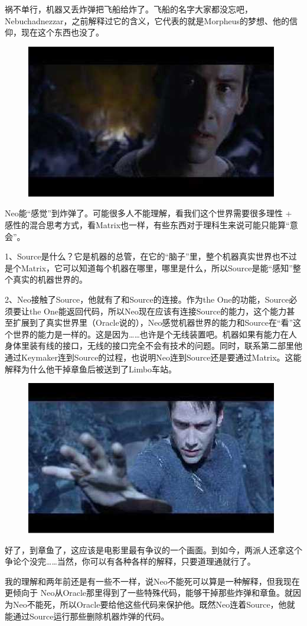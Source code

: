 \documentclass[UTF8]{ctexart}
\begin{document}
祸不单行，机器又丢炸弹把飞船给炸了。飞船的名字大家都没忘吧，Nebuchadnezzar，之前解释过它的含义，它代表的就是Morpheus的梦想、他的信仰，现在这个东西也没了。

\begin{figure}[htb]
\centering
\includegraphics[width=0.5\linewidth]{fig/read_reloaded-176}
\end{figure}

Neo能“感觉”到炸弹了。可能很多人不能理解，看我们这个世界需要很多理性 + 感性的混合思考方式，看Matrix也一样，有些东西对于理科生来说可能只能算“意会”。

1、Source是什么？它是机器的总管，在它的“脑子”里，整个机器真实世界也不过是个Matrix，它可以知道每个机器在哪里，哪里是什么，所以Source是能“感知”整个真实的机器世界的。

2、Neo接触了Source，他就有了和Source的连接。作为the One的功能，Source必须要让the One能返回代码，所以Neo现在应该有连接Source的能力，这个能力甚至扩展到了真实世界里（Oracle说的），Neo感觉机器世界的能力和Source在“看”这个世界的能力是一样的。这是因为……也许是个无线装置吧。机器如果有能力在人身体里装有线的接口，无线的接口完全不会有技术的问题。同时，联系第二部里他通过Keymaker连到Source的过程，也说明Neo连到Source还是要通过Matrix。这能解释为什么他干掉章鱼后被送到了Limbo车站。

\begin{figure}[htb]
\centering
\includegraphics[width=0.5\linewidth]{fig/read_reloaded-177}
\end{figure}

好了，到章鱼了，这应该是电影里最有争议的一个画面。到如今，两派人还拿这个争论个没完……当然，你可以有各种各样的解释，只要道理通就行了。

我的理解和两年前还是有一些不一样，说Neo不能死可以算是一种解释，但我现在更倾向于 Neo从Oracle那里得到了一些特殊代码，能够干掉那些炸弹和章鱼。就因为Neo不能死，所以Oracle要给他这些代码来保护他。既然Neo连着Source，他就能通过Source运行那些删除机器炸弹的代码。
\end{document}
